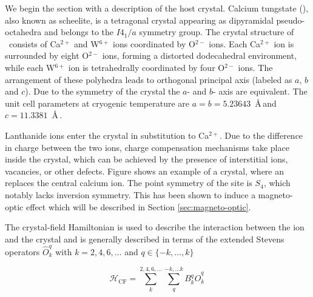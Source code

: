 We begin the section with a description of the host crystal. Calcium tungstate (\Ca), also known as scheelite, is a tetragonal crystal appearing as dipyramidal pseudo-octahedra and belongs to the $I4_1/a$ symmetry group. The crystal structure of \Ca\ consists of Ca$^{2+}$ and W$^{6+}$ ions coordinated by O$^{2-}$ ions. Each Ca$^{2+}$ ion is surrounded by eight O$^{2-}$ ions, forming a distorted dodecahedral environment, while each W$^{6+}$ ion is tetrahedrally coordinated by four O$^{2-}$ ions. The arrangement of these polyhedra leads to orthogonal principal axis (labeled as $a$, $b$ and $c$). Due to the symmetry of the crystal the $a$- and $b$- axis are equivalent. The unit cell parameters at cryogenic temperature are $a=b=5.23643$~\AA\,and $c=11.3381$~\AA\,. 

Lanthanide ions enter the crystal in substitution to Ca$^{2+}$. Due to the difference in charge between the two ions, charge compensation mechanisms take place inside the crystal, which can be achieved by the presence of interstitial ions, vacancies, or other defects. Figure  shows an example of a \Ca crystal, where an \Er replaces the central calcium ion. The point symmetry of the \Er site is $S_4$, which notably lacks inversion symmetry. This has been shown to induce a magneto-optic effect which will be described in Section \ref{sec:magneto-optic}.

The crystal-field Hamiltonian is used to describe the interaction between the ion and the crystal and is generally described in terms of the extended Stevens operators $\hat{O}^q_k$ with $k=2,4,6,\dots$ and $q \in \{-k,\dots, k\}$ 

\begin{equation}
    \mathcal{H}_{\mathrm{CF}} = \sum_{k}^{2,4,6,\dots}\sum_{q}^{-k,...k} B_k^q \hat{O}^q_k \,
\end{equation}

